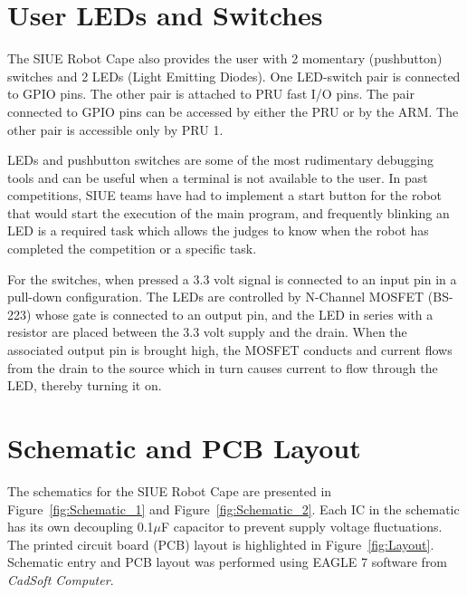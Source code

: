 \documentclass[12pt,oneside,final]{siuethesis}
\theoremstyle{definition}
\begin{document}
\section{User LEDs and Switches}

The SIUE Robot Cape also provides the user with 2 momentary (pushbutton) switches and 2 LEDs (Light Emitting Diodes). One LED-switch pair is connected to GPIO pins.  The other pair is attached to PRU fast I/O pins. The pair connected to GPIO pins can be accessed by either the PRU or by the ARM. The other pair is accessible only by PRU 1.

LEDs and pushbutton switches are some of the most rudimentary debugging tools and can be useful when a terminal is not available to the user. In past competitions, SIUE teams have had to implement a start button for the robot that would start the execution of the main program, and frequently blinking an LED is a required task which allows the judges to know when the robot has completed the competition or a specific task. 

For the switches, when pressed a 3.3 volt signal is connected to an input pin in a pull-down configuration. The LEDs are controlled by N-Channel MOSFET (BS-223) whose gate is connected to an output pin, and the LED in series with a resistor are placed between the 3.3 volt supply and the drain. When the associated output pin is brought high, the MOSFET conducts and current flows from the drain to the source which in turn causes current to flow through the LED, thereby turning it on.


\section{Schematic and PCB Layout}

The schematics for the SIUE Robot Cape are presented in Figure~\ref{fig:Schematic_1} and Figure~\ref{fig:Schematic_2}. Each IC in the schematic has its own decoupling 0.1$ \mu$F capacitor to prevent supply voltage fluctuations. The printed circuit board (PCB) layout is highlighted in Figure~\ref{fig:Layout}. Schematic entry and PCB layout was performed using EAGLE 7 software from \emph{CadSoft Computer}.
\end{document}
